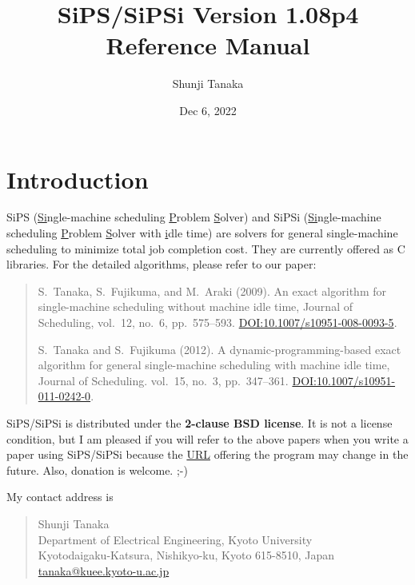 \documentclass[a4paper]{book}
\begin{document}
\title{SiPS/SiPSi Version 1.08p4 Reference Manual}
\author{Shunji Tanaka}
\date{Dec 6, 2022}
\maketitle

\tableofcontents

\chapter{Introduction}

SiPS (\underline{Si}ngle-machine scheduling \underline{P}roblem \underline{S}olver) and SiPSi (\underline{Si}ngle-machine scheduling \underline{P}roblem \underline{S}olver with \underline{i}dle time) are solvers for general single-machine scheduling to minimize total job completion cost.
They are currently offered as C libraries.
For the detailed algorithms, please refer to our paper:

\begin{quotation}
  S.~Tanaka, S.~Fujikuma, and M.~Araki (2009).
  An exact algorithm for single-machine scheduling without machine idle time,
  Journal of Scheduling, vol.~12, no.~6, pp.~575--593.
  \href{http://dx.doi.org/10.1007/s10951-008-0093-5}%
  {DOI:10.1007/s10951-008-0093-5}.

  S.~Tanaka and S.~Fujikuma (2012).
  A dynamic-programming-based exact algorithm for general
  single-machine scheduling with machine idle time,
  Journal of Scheduling. vol.~15, no.~3, pp.~347--361.
  \href{http://dx.doi.org/10.1007/s10951-011-0242-0}%
  {DOI:10.1007/s10951-011-0242-0}.
\end{quotation}

SiPS/SiPSi is distributed under the {\bf 2-clause BSD license}.
It is not a license condition, but I am pleased if you will refer to the above papers when you write a paper using SiPS/SiPSi because the \href{https://sites.google.com/site/shunjitanaka/sips}{URL} offering the program may change in the future. Also, donation is welcome. ;-)

My contact address is
\begin{quote}
  Shunji Tanaka\\
  Department of Electrical Engineering, Kyoto University\\
  Kyotodaigaku-Katsura, Nishikyo-ku, Kyoto 615-8510, Japan\\
  \href{mailto:tanaka@kuee.kyoto-u.ac.jp}{tanaka@kuee.kyoto-u.ac.jp}
\end{quote}
\end{document}
